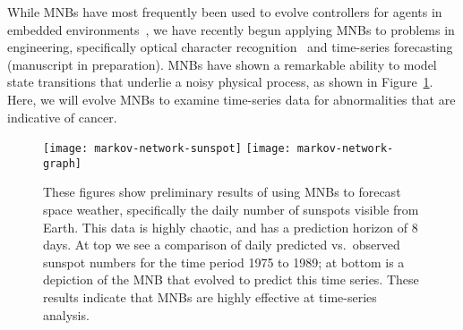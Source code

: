 While MNBs have most frequently been used to evolve controllers for agents in embedded environments~\cite{Edlund:2011kt,Olson:2013kx,Olson:2013ko}, we have recently begun applying MNBs to problems in engineering, specifically optical character recognition~\cite{Chapman:2013kf} and time-series forecasting (manuscript in preparation).  
%
MNBs have shown a remarkable ability to model state transitions that underlie a noisy physical process, as shown in Figure~\ref{f:mnb-model}.  Here, we will evolve MNBs to examine time-series data for abnormalities that are indicative of cancer.

\begin{figure}
\centering
\texttt{[image: markov-network-sunspot]}
\texttt{[image: markov-network-graph]}
\caption{These figures show preliminary results of using MNBs to forecast space weather, specifically the daily number of sunspots visible from Earth.  This data is highly chaotic, and has a prediction horizon of 8 days.  At top we see a comparison of daily predicted vs.~observed sunspot numbers for the time period 1975 to 1989; at bottom is a depiction of the MNB that evolved to predict this time series.  These results indicate that MNBs are highly effective at time-series analysis.}
\label{f:mnb-model}
\end{figure}







